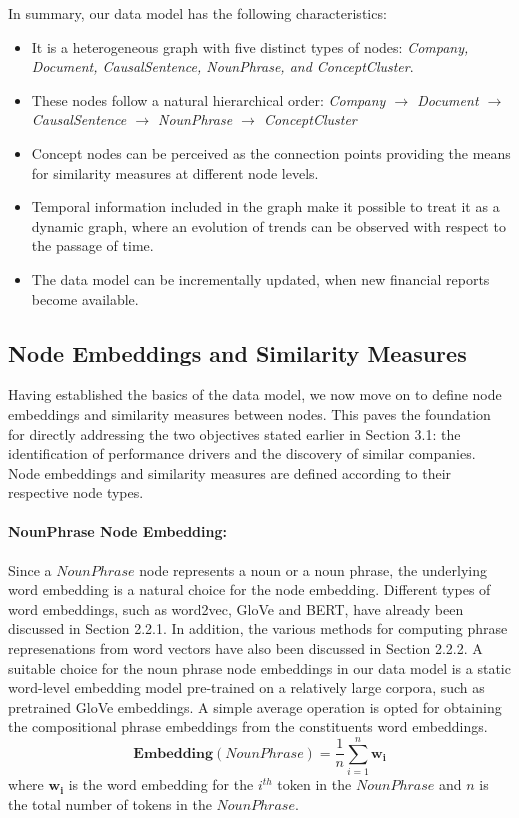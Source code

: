 \documentclass [
     12pt,         %
     a4paper,      %
     BCOR10mm,     %
     DIV14,        %
     liststotoc,   %
     bibtotoc,     %
     idxtotoc,     %
     parskip       %
     ]{scrreprt}
\begin{document}
In summary, our data model has the following characteristics: 

\begin{itemize}
	\item	 It is a heterogeneous graph with five distinct types of nodes: \emph{Company, Document, CausalSentence, NounPhrase, and ConceptCluster}.
	\item	 These nodes follow a natural hierarchical order: \emph{Company $\rightarrow$ Document $\rightarrow$  CausalSentence $\rightarrow$ NounPhrase $\rightarrow$ ConceptCluster} 
	\item 	Concept nodes can be perceived as the connection points providing the means for similarity measures at different node levels. 
	\item 	Temporal information included in the graph make it possible to treat it as a dynamic graph, where an evolution of trends can be observed with respect to the passage of time. 
	\item 	The data model can be incrementally updated, when new financial reports become available.
\end{itemize}





\subsection{Node Embeddings and Similarity Measures} \label{sec:similarity}

Having established the basics of the data model, we now move on to define node embeddings and similarity measures between nodes. This paves the foundation for directly addressing the two objectives stated earlier in Section 3.1: the identification of performance drivers and the discovery of similar companies. Node embeddings and similarity measures are defined according to their respective node types.


\paragraph{NounPhrase Node Embedding:} Since a $NounPhrase$ node represents a noun or a noun phrase, the underlying word embedding is a natural choice for the node embedding. Different types of word embeddings, such as word2vec, GloVe and BERT, have already been discussed in Section 2.2.1. In addition, the various methods for computing phrase represenations from word vectors have also been discussed in Section 2.2.2. A suitable choice for the noun phrase node embeddings in our data model is a static word-level embedding model pre-trained on a relatively large corpora, such as pretrained GloVe embeddings. A simple average operation is opted for obtaining the compositional phrase embeddings from the constituents word embeddings. 
\[ \mathbf{Embedding}(NounPhrase) = \frac{1}{n} \sum_{i=1} ^n {\mathbf{w_i}}\]  
where $\mathbf{w_i}$ is the word embedding for the $i^{th}$ token in the $NounPhrase$ and $n$ is the total number of tokens in the $NounPhrase$. 
\end{document}

